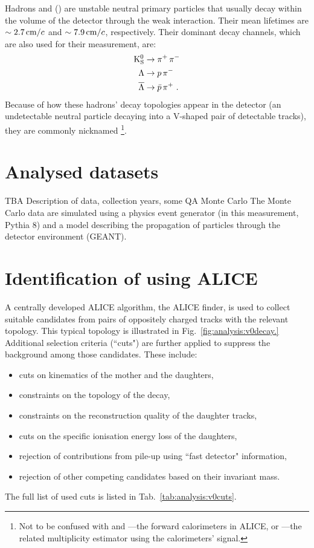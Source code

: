 \def \imgpath {"./figures/analysis"}
Hadrons \KOs and \LA (\AL) are unstable neutral primary particles that usually decay within the volume of the detector through the weak interaction. Their mean lifetimes are $\sim 2.7 \text{\,cm/$c$}$ and $\sim 7.9 \text{\,cm/$c$}$, respectively.\cite{alicecollaborationALICEDefinitionPrimary2017} Their dominant decay channels, which are also used for their measurement, are:
\begin{align}
\rm{K^0_S} &\rightarrow \pi^{+} \, \pi^{-} \\
\Lambda &\rightarrow p \, \pi^{-} \\
\overline{\Lambda} &\rightarrow \bar{p} \, \pi^{+} \, \, .
\end{align}
Because of how these hadrons' decay topologies appear in the detector (an undetectable neutral particle decaying into a V-shaped pair of detectable tracks), they are commonly nicknamed \VOs \footnote{Not to be confused with \VOA and \VOC---the forward calorimeters in ALICE, or \VOM---the related multiplicity estimator using the calorimeters' signal.}. 

\section{Analysed datasets}
TBA
Description of data, collection years, some QA
Monte Carlo
The Monte Carlo data are simulated using a physics event generator (in this measurement, Pythia 8\cite{bierlichComprehensiveGuidePhysics2022}) and a model describing the propagation of particles through the detector environment (GEANT\cite{brunGEANTDetectorDescription1993,agostinelliGEANT4aSimulationToolkit2003}). 

\section{Identification of \VOs using ALICE}\label{sec:ana:cuts}
A centrally developed ALICE algorithm, the ALICE \VO finder, is used to collect suitable \VO candidates from pairs of oppositely charged tracks  with the relevant topology. This typical topology is illustrated in Fig.~\ref{fig:analysis:v0decay.} %
Additional selection criteria (``cuts") are further applied to suppress the background among those candidates. These include:
\begin{itemize}
\item cuts on kinematics of the mother and the daughters,
\item constraints on the topology of the decay,
\item constraints on the reconstruction quality of the daughter tracks,
\item cuts on the specific ionisation energy loss of the daughters, 
\item rejection of contributions from pile-up using ``fast detector" information,
\item rejection of other competing \VO candidates based on their invariant mass.
\end{itemize}
The full list of used cuts is listed in Tab.~\ref{tab:analysis:v0cuts}.

